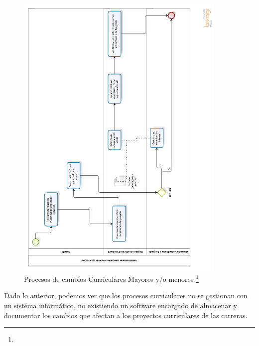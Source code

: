 		\begin{figure}[H]
			\centering
			\includegraphics[width=0.9\textwidth]{images/Capitulo_1/Procesos_cambios_curriculares.png}
			\caption[Procesos de cambios Curriculares Mayores y/o menores ]{Procesos de cambios Curriculares Mayores y/o menores  \footnote{}}
			\label{Figura2}
		\end{figure}
		
		\newpage
		
		
		Dado lo anterior, podemos ver que los procesos curriculares no se gestionan con un sistema informático, no existiendo un software encargado  de almacenar y documentar los cambios que afectan a los proyectos curriculares de las carreras.
		
	

